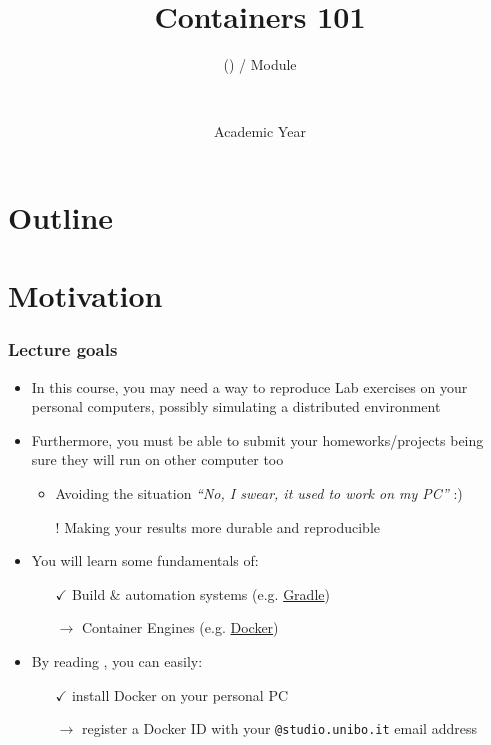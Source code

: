 \documentclass[presentation]{beamer}\mode<presentation>{\usetheme{AMSBolognaFC}}
\title[\currentLab{} -- Containers 101]{Containers 101}
\subtitle{\courseName{} (\courseAcronym) / Module \moduleN{}}
\author[\sspeaker{\gcShort} \& \mmShort]{
	\speaker{\gcFull} \and \mmFull
	\\ 
	\gcEmail \and \mmEmail
}
\institute[\disiShort, \uniboShort]{\disi{} (\disiShort)\\\unibo}
\date[A.Y. \academicYear{}]{Academic Year \academicYear{}}
\begin{document}

\frame{\titlepage}

\section*{Outline}
%
\frame[c]{\tableofcontents[hideallsubsections]}

\section{Motivation}

\begin{frame}
\frametitle{Lecture goals}

    \begin{itemize}
        \item In this course, you may need a way to reproduce Lab exercises on your personal computers, possibly simulating a distributed environment

        \vfill{}

        \item Furthermore, you must be able to submit your homeworks/projects being sure they will run on other computer too
        \begin{itemize}
            \item Avoiding the situation \emph{``No, I swear, it used to work on my PC''} :)

            \item[!] Making your results more durable and \alert{reproducible}
        \end{itemize}

        \vfill{}

        \item You will learn some fundamentals of:
        \begin{itemize}
            \item[$\checkmark$] Build \& automation systems (e.g. \href{https://gradle.org/}{Gradle})
            \item[$\rightarrow$] Container Engines (e.g. \href{https://www.docker.com/}{Docker})
        \end{itemize}

        \vfill{}

        \item By reading \cite{envConf}, you can easily:
        \begin{itemize}
            \item[$\checkmark$] install Docker on your personal PC
            \item[$\rightarrow$] register a Docker ID with your \texttt{@studio.unibo.it} email address
        \end{itemize}
    \end{itemize}

\end{frame}
\end{document}
